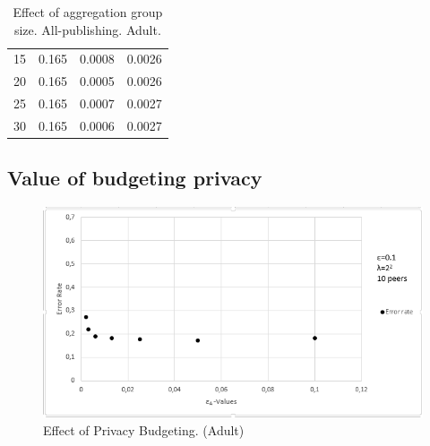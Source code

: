 \begin{table}[]
\begin{tabular}{|l|l|l|l|}
		15                                                          & 0.165                                                       & 0.0008                                                           & 0.0026                                                               \\
		20                                                          & 0.165                                                       & 0.0005                                                           & 0.0026                                                               \\
		25                                                          & 0.165                                                       & 0.0007                                                           & 0.0027                                                               \\
		30                                                          & 0.165                                                       & 0.0006                                                           & 0.0027                                                              
	\end{tabular}
	\caption{Effect of aggregation group size. All-publishing. Adult.}
	\label{tab:results_groupsize_all}
\end{table}

\subsection{Value of budgeting privacy}

\begin{figure}[H]
	\centering
	\includegraphics[width=.8\textwidth]{fig/adult/results_privacy_budget}
	\caption{Effect of Privacy Budgeting. (Adult)}
	\label{fig:results_privacy_budget}
\end{figure}




\cleardoublepage